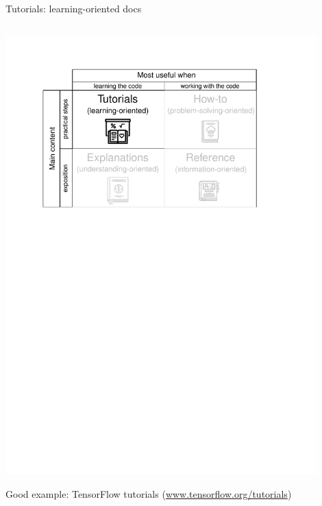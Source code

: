 \documentclass[english,aspectratio=169]{beamer}
\begin{document}
\begin{frame}{Tutorials: learning-oriented docs}
\begin{columns}[onlytextwidth]
\begin{column}{0.5\textwidth}
    \begin{center}
    \includegraphics[width=0.9\textwidth]{./figures/documentation-system-tutorials}
    \end{center}
    \begin{exampleblock}{}
        \centering
        Good example: TensorFlow tutorials
        (\url{www.tensorflow.org/tutorials})
    \end{exampleblock}
\end{column}

\end{columns}

\end{frame}
\end{document}
